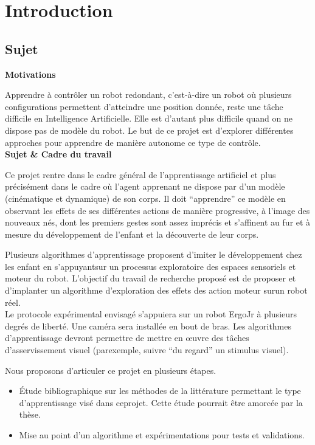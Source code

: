 \documentclass[11pt,french]{article}
\begin{document}
\section{Introduction}
\subsection{Sujet}

\noindent\textbf{Motivations}

Apprendre à contrôler un robot redondant, c’est-à-dire un robot où plusieurs configurations permettent d’atteindre une position donnée, reste une tâche difficile en Intelligence Artificielle. Elle est d’autant plus difficile quand on ne dispose pas de modèle du robot. Le but de ce projet est d’explorer différentes approches pour apprendre de manière autonome ce type de contrôle.\\[10pt]
\noindent\textbf{Sujet \& Cadre du travail}

Ce projet rentre dans le cadre général de l’apprentissage artificiel et plus précisément dans le cadre où l’agent apprenant ne dispose par d’un modèle (cinématique et dynamique) de son corps. Il doit “apprendre” ce modèle en observant les effets de ses différentes actions de manière progressive, à l’image des nouveaux nés, dont les premiers gestes sont assez imprécis et s’affinent au fur et à mesure du développement de l’enfant et la découverte de leur corps.

Plusieurs algorithmes d’apprentissage proposent d’imiter le développement chez les enfant en s’appuyantsur un processus exploratoire des espaces sensoriels et moteur du robot. L’objectif du travail de recherche proposé est de proposer et d’implanter un algorithme d’exploration des effets des action moteur surun robot réel.\\[10pt]
Le protocole expérimental envisagé s’appuiera sur un robot ErgoJr à plusieurs degrés de liberté. Une caméra sera installée en bout de bras. Les algorithmes d’apprentissage devront permettre de mettre en œuvre des tâches d’asservissement visuel (parexemple, suivre “du regard” un stimulus visuel).

Nous proposons d’articuler ce projet en plusieurs étapes.
\begin{itemize}
    \item Étude bibliographique sur les méthodes de la littérature permettant le type d’apprentissage visé dans ceprojet. Cette étude pourrait être amorcée par la thèse.
    \item Mise au point d’un algorithme et expérimentations pour tests et validations.
\end{itemize}
\end{document}
